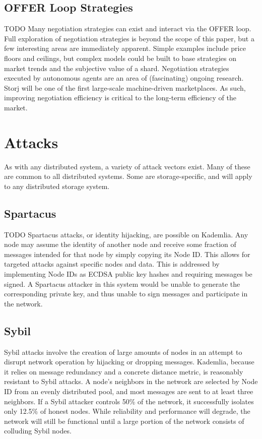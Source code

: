 \documentclass[a4paper,10pt]{article}
\newcommand{\todo}[1]{{\color{red} TODO #1}}
\begin{document}
\subsection{OFFER Loop Strategies}

\todo{
Many negotiation strategies can exist and interact via the OFFER loop. Full
exploration of negotiation strategies is beyond the scope of this paper, but a
few interesting areas are immediately apparent. Simple examples include price
floors and ceilings, but complex models could be built to base strategies on
market trends and the subjective value of a shard. Negotiation strategies
executed by autonomous agents are an area of (fascinating) ongoing research.
Storj will be one of the first large-scale machine-driven marketplaces. As such,
improving negotiation efficiency is critical to the long-term efficiency of the
market.
}

\section{Attacks}

As with any distributed system, a variety of attack vectors exist. Many of these
are common to all distributed systems. Some are storage-specific, and will apply
to any distributed storage system.

\subsection{Spartacus}

\todo{
Spartacus attacks, or identity hijacking, are possible on Kademlia. Any node may
assume the identity of another node and receive some fraction of messages
intended for that node by simply copying its Node ID. This allows for targeted
attacks against specific nodes and data. This is addressed by implementing Node
IDs as ECDSA public key hashes and requiring messages be signed. A Spartacus
attacker in this system would be unable to generate the corresponding private
key, and thus unable to sign messages and participate in the network.
}

\subsection{Sybil}

Sybil attacks involve the creation of large amounts of nodes in an attempt to
disrupt network operation by hijacking or dropping messages. Kademlia, because
it relies on message redundancy and a concrete distance metric, is reasonably
resistant to Sybil attacks. A node’s neighbors in the network are selected by
Node ID from an evenly distributed pool, and most messages are sent to at least
three neighbors. If a Sybil attacker controls 50\% of the network, it
successfully isolates only 12.5\% of honest nodes. While reliability and
performance will degrade, the network will still be functional until a large
portion of the network consists of colluding Sybil nodes.
\end{document}
